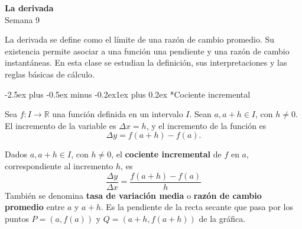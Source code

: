 \documentclass[10pt,a5paper]{article}
\makeatletter
\renewcommand\section{\@startsection{section}{1}{\z@}%
  {-2.5ex plus -0.5ex minus -0.2ex}{1ex plus 0.2ex}%
  {\normalfont\normalsize\bfseries\color{Azul}}}
\makeatother
\begin{document}
\begin{center}
  {\color{Azul}\large\bfseries La derivada}\\[2pt]
  {\small Semana 9}
\end{center}

La derivada se define como el límite de una razón de cambio promedio. Su existencia permite asociar a una función una pendiente y una razón de cambio instantáneas. En esta clase se estudian la definición, sus interpretaciones y las reglas básicas de cálculo.

\section*{Cociente incremental}

Sea $f\colon I\to\mathbb{R}$ una función definida en un intervalo $I$. Sean $a,a+h\in I$, con $h\neq0$. El incremento de la variable es $\Delta x=h$, y el incremento de la función es
\[
  \Delta y=f(a+h)-f(a).
\]

\begin{definicion}
Dados $a,a+h\in I$, con $h\neq0$, el \textbf{cociente incremental} de $f$ en $a$, correspondiente al incremento $h$, es
\[
  \frac{\Delta y}{\Delta x}=\frac{f(a+h)-f(a)}h
\]
También se denomina \textbf{tasa de variación media} o \textbf{razón de cambio promedio} entre $a$ y $a+h$. Es la pendiente de la recta secante que pasa por los puntos $P=(a,f(a))$ y $Q=(a+h,f(a+h))$ de la gráfica.
\end{definicion}

\begin{center}
\end{center}
\end{document}
